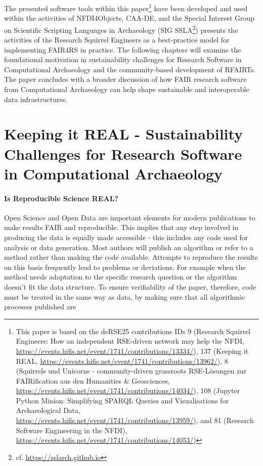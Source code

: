 \documentclass{eceasst}
\begin{document}
The presented software tools within this paper\footnote{This paper is based on the deRSE25 contributions IDs 9 (Research Squirrel Engineers: How an independent RSE-driven network may help the NFDI, \url{https://events.hifis.net/event/1741/contributions/13334/}), 137 (Keeping it REAL, \url{https://events.hifis.net/event/1741/contributions/13962/}), 8 (Squirrels und Unicorns - community-driven grassroots RSE-Lösungen zur FAIRification aus den Humanities \& Geosciences, \url{https://events.hifis.net/event/1741/contributions/14034/}), 108 (Jupyter Python Minion: Simplifying SPARQL Queries and Visualisations for Archaeological Data, \url{https://events.hifis.net/event/1741/contributions/13959/}), and 81 (Research Software Engineering in the NFDI), \url{https://events.hifis.net/event/1741/contributions/14053/})} have been developed and used within the activities of NFDI4Objects, CAA-DE, and the Special Interest Group on Scientific Scripting Languages in Archaeology (SIG SSLA\footnote{cf. \url{https://sslarch.github.io}}) presents the activities of the Research Squirrel Engineers as a best-practice model for implementing FAIR4RS in practice. The following chapters will examine the foundational motivation in sustainability challenges for Research Software in Computational Archaeology and the community-based development of RFAIRTs. The paper concludes with a broader discussion of how FAIR research software from Computational Archaeology can help shape sustainable and interoperable data infrastructures.

\section{Keeping it REAL - Sustainability Challenges for Research Software in Computational Archaeology}
\label{sec:REAL}

\paragraph{Is Reproducible Science REAL?} Open Science and Open Data are important elements for modern publications to make results FAIR and reproducible. This implies that any step involved in producing the data is equally made accessible - this includes any code used for analysis or data generation. Most authors will publish an algorithm or refer to a method rather than making the code available. Attempts to reproduce the results on this basis frequently lead to problems or deviations. For example when the method needs adaptation to the specific research question or the algorithm doesn't fit the data structure. To ensure verifiability of the paper, therefore, code must be treated in the same way as data, by making sure that all algorithmic processes published are
\end{document}
